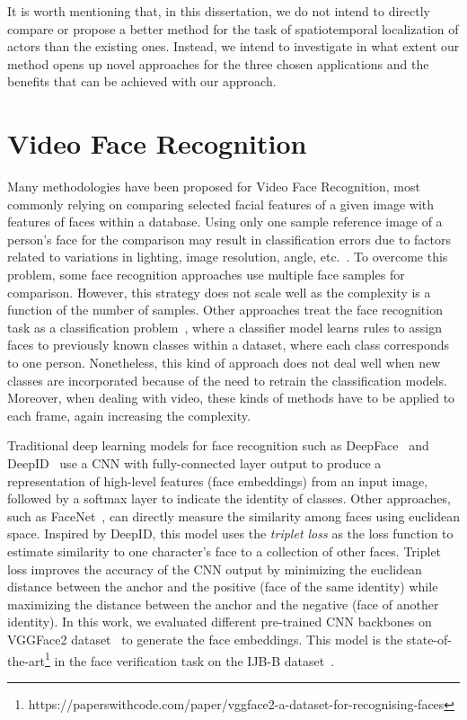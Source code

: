 It is worth mentioning that, in this dissertation, we do not intend to directly compare or propose a better method for the task of spatiotemporal localization of actors than the existing ones. Instead, we intend to investigate in what extent our method opens up novel approaches for the three chosen applications and the benefits that can be achieved with our approach.

\section{Video Face Recognition}
\label{sec:video_face}

Many methodologies have been proposed for Video Face Recognition, most commonly relying on comparing selected facial features of a given image with features of faces within a database.
Using only one sample reference image of a person's face for the comparison may result in classification errors due to factors related to variations in lighting, image resolution, angle, etc.~\cite{598229}.
To overcome this problem, some face recognition approaches use multiple face samples for comparison. However, this strategy does not scale well as the complexity is a function of the number of samples.
Other approaches treat the face recognition task as a classification problem~\cite{dadi2016improved, ghosal}, where a classifier model learns rules to assign faces to previously known classes within a dataset, where each class corresponds to one person.
Nonetheless, this kind of approach does not deal well when new classes are incorporated because of the need to retrain the classification models.
Moreover, when dealing with video, these kinds of methods have to be applied to each frame, again increasing the complexity.


Traditional deep learning models for face recognition such as DeepFace~\cite{taigman2014deepface} and DeepID~\cite{sun2014deep} use a CNN with fully-connected layer output to produce a representation of high-level features (face embeddings) from an input image, followed by a softmax layer to indicate the identity of classes. Other approaches, such as FaceNet~\cite{schroff2015facenet}, can directly measure the similarity among faces using euclidean space. Inspired by DeepID, this model uses the \textit{triplet loss} as the loss function to estimate similarity to one character's face to a  collection of other faces. Triplet loss improves the accuracy of the  CNN output by minimizing the euclidean distance between the anchor and the positive (face of the same identity) while maximizing the distance between the anchor and the negative (face of another identity). In this work, we evaluated different pre-trained CNN backbones on VGGFace2 dataset~\cite{cao2018vggface2} to generate the face embeddings. This model is the state-of-the-art\footnote{https://paperswithcode.com/paper/vggface2-a-dataset-for-recognising-faces} in the face verification task on the IJB-B dataset~\cite{whitelam2017iarpa}. 


